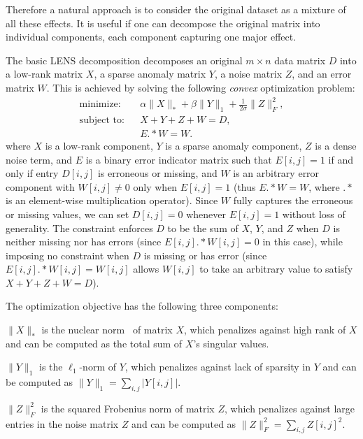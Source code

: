 Therefore a natural approach is to consider the
original dataset as a mixture of all these effects.  It is useful if
one can decompose the original matrix into individual components, each
component capturing one major effect.

 The basic LENS decomposition decomposes an original $m\times n$ data matrix $D$ into
a low-rank matrix $X$, a sparse anomaly matrix $Y$, a noise matrix
$Z$, and an error matrix $W$.  This is achieved by solving the
following {\em convex} optimization problem:
\begin{eqnarray}
\text{minimize:} && \alpha \|X\|_* + \beta \|Y\|_1 + 
                    \frac{1}{2\sigma}\|Z\|_F^2, \nonumber\\
\text{subject to:}&& X + Y + Z + W = D, \nonumber\\
&& E.*W = W.
\label{eq:lens-basic}
\end{eqnarray}
where $X$ is a low-rank component, $Y$ is a sparse anomaly component,
$Z$ is a dense noise term, and $E$ is a binary error indicator matrix
such that $E[i,j] = 1$ if and only if entry $D[i,j]$ is erroneous or
missing, and $W$ is an arbitrary error component with $W[i,j] \neq 0$
only when $E[i,j] = 1$ (thus $E.*W = W$, where $.*$ is an element-wise
multiplication operator). Since $W$ fully captures the erroneous or
missing values, we can set $D[i,j] = 0$ whenever $E[i,j] = 1$ without
loss of generality. The constraint enforces $D$ to be the sum of $X$,
$Y$, and $Z$ when $D$ is neither missing nor has errors (since
$E[i,j].*W[i,j] = 0$ in this case), while imposing no constraint when
$D$ is missing or has error (since $E[i,j].*W[i,j]=W[i,j]$ allows
$W[i,j]$ to take an arbitrary value to satisfy $X+Y+Z+W=D$).

The optimization objective has the following three components:
\squishlist
\item $\|X\|_*$ is the nuclear norm~\cite{recht08:_nec,recht:_guaran} of
  matrix $X$, which penalizes against high rank of $X$ and can be
  computed as the total sum of $X$'s singular values.

\item $\|Y\|_1$ is the $\ell_1$-norm of $Y$, which penalizes against
  lack of sparsity in $Y$ and can be computed as $\|Y\|_1 = \sum_{i,j}
  |Y[i,j]|$.

\item $\|Z\|_F^2$ is the squared Frobenius norm of matrix $Z$, which
penalizes against large entries in the noise matrix $Z$ and can be computed as
$\|Z\|_F^2 = \sum_{i,j} Z[i,j]^2$.

